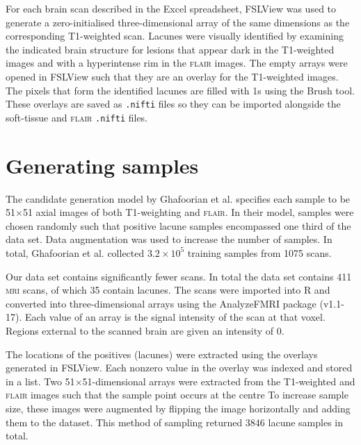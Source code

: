 For each brain scan described in the Excel spreadsheet, FSLView was used to generate a zero-initialised three-dimensional array of the same dimensions as the corresponding T1-weighted scan. Lacunes were visually identified by examining the indicated brain structure for lesions that appear dark in the T1-weighted images and with a hyperintense rim in the \textsc{flair} images. The empty arrays were opened in FSLView such that they are an overlay for the T1-weighted images. The pixels that form the identified lacunes are filled with 1s using the Brush tool. These overlays are saved as \texttt{.nifti} files so they can be imported alongside the soft-tissue and \textsc{flair} \texttt{.nifti} files.



\section{Generating samples}\label{data-samples}

The candidate generation model by Ghafoorian et al. \cite{GhafoorianM.2017Dml3} specifies each sample to be 51$\times$51 axial images of both T1-weighting and \textsc{flair}. In their model, samples were chosen randomly such that positive lacune samples encompassed one third of the data set. Data augmentation was used to increase the number of samples. In total, Ghafoorian et al. collected $3.2\times10^5$ training samples from 1075 scans.

Our data set contains significantly fewer scans. In total the data set contains 411 \textsc{mri} scans, of which 35 contain lacunes. The scans were imported into R and converted into three-dimensional arrays using the AnalyzeFMRI package (v1.1-17). Each value of an array is the signal intensity of the scan at that voxel. Regions external to the scanned brain are given an intensity of 0.

The locations of the positives (lacunes) were extracted using the overlays generated in FSLView. Each nonzero value in the overlay was indexed and stored in a list. Two 51$\times$51-dimensional arrays were extracted from the T1-weighted and \textsc{flair} images such that the sample point occurs at the centre To increase sample size, these images were augmented by flipping the image horizontally and adding them to the dataset. This method of sampling returned 3846 lacune samples in total.

